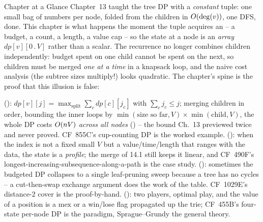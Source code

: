 \begin{chaptertheorybox}{Chapter at a Glance}
Chapter~13 taught the tree DP with a \emph{constant} tuple: one small bag of
numbers per node, folded from the children in $O(\deg(v))$, one DFS, done.
This chapter is what happens the moment the tuple acquires an
 -- a budget, a count, a length, a value cap -- so the state at a
node is an \emph{array} $\mathit{dp}[v][0\,.\,V]$ rather than a scalar.  The
recurrence no longer combines children independently: budget spent on one
child cannot be spent on the next, so children must be merged \emph{one at a
time} in a knapsack loop, and the naive cost analysis (the subtree sizes
multiply!) looks quadratic.  The chapter's spine is the proof that this
illusion is false:

 ():
$\mathit{dp}[v][j] = \max_{\text{split}} \sum_c \mathit{dp}[c][j_c]$
with $\sum_c j_c \le j$; merging children in order, bounding the inner loops
by $\min(\text{size so far},V)\times\min(\text{child},V)$, the whole DP costs
$O(nV)$ \emph{across all nodes} () -- the bound Ch.~13
previewed twice and never proved.  CF~855C's cup-counting DP is the worked
example.
 (): when the index is not a fixed
small $V$ but a value/time/length that ranges with the data, the state is a
\emph{profile}; the merge of 14.1 still keeps it linear, and CF~490F's
longest-increasing-subsequence-along-a-path is the case study.
 (): sometimes the
budgeted DP collapses to a single leaf-pruning sweep because a tree has no
cycles -- a cut-then-swap exchange argument does the work of the table.
CF~1029E's distance-$2$ cover is the proof-by-hand.
 (): two players, optimal play, and the
value of a position is a $\mathrm{mex}$ or a win/lose flag propagated up the
trie; CF~455B's four-state per-node DP is the paradigm, Sprague--Grundy the
general theory.


\end{chaptertheorybox}
